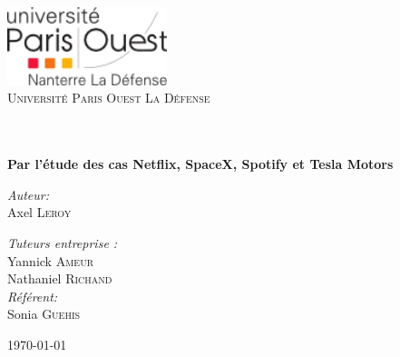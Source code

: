 \begin{titlepage}
\begin{center}

\includegraphics[width=0.35\textwidth]{./ParisOuest}~\\[1cm]

\textsc{\LARGE Université Paris Ouest La Défense}\\[1.5cm]

\textsc{\Large }\\[0.5cm]

\HRule

{\huge \bfseries \thetitle \\[0.4cm] }
{\Large \bfseries Par l'étude des cas Netflix, SpaceX, Spotify et Tesla Motors \\[0.4cm]}

\HRule

\vspace{5mm}

\begin{minipage}{0.4\textwidth}
\begin{flushleft} \large
\emph{Auteur:}\\
Axel \textsc{Leroy}
\end{flushleft}
\end{minipage}
\begin{minipage}{0.4\textwidth}
\begin{flushright} \large
\emph{Tuteurs entreprise :} \\
Yannick \textsc{Ameur}\\
Nathaniel \textsc{Richand}\\
\emph{Référent:} \\
Sonia \textsc{Guehis}
\end{flushright}
\end{minipage}

\vfill

{\large \today}

\end{center}
\end{titlepage}